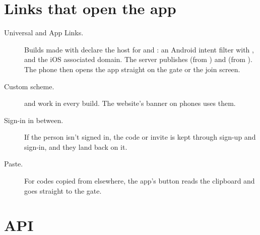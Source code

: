 \section{Links that open the app}

\begin{description}
  \item[Universal and App Links.] Builds made with  declare the host for  and : an Android intent filter with , and the iOS associated domain. The server publishes  (from ) and  (from ). The phone then opens the app straight on the gate or the join screen.
  \item[Custom scheme.]  and  work in every build. The website's  banner on phones uses them.
  \item[Sign-in in between.] If the person isn't signed in, the code or invite is kept through sign-up and sign-in, and they land back on it.
  \item[Paste.] For codes copied from elsewhere, the app's  button reads the clipboard and goes straight to the gate.
\end{description}

\section{API}

